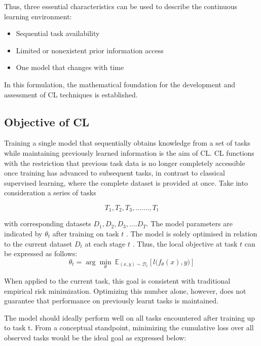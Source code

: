 \documentclass[english, LaM, oneside]{sapthesis}%
\numberwithin{equation}{chapter}
\begin{document}
Thus, three essential characteristics can be used to describe the continuous learning environment:

    \begin{itemize}
        \item Sequential task availability
        \item Limited or nonexistent prior information access
        \item One model that changes with time
    \end{itemize}

In this formulation, the mathematical foundation for the development and assessment of CL techniques is established.

\subsection{Objective of CL}
Training a single model that sequentially obtains knowledge from a set of tasks while maintaining previously learned information is the aim of CL. CL functions with the restriction that previous task data is no longer completely accessible once training has advanced to subsequent tasks, in contrast to classical supervised learning, where the complete dataset is provided at once.
Take into consideration a series of tasks

\begin{equation}
    T_1,T_2,T_3,\ldots\ldots.,T_t
\end{equation}

with corresponding datasets $D_1,D_2,D_3,\ldots.D_T$. The model parameters are indicated by $\theta_t$ after training on task $t$ . The model is solely optimised in relation to the current dataset $D_t$ at each stage $t$ . Thus, the local objective at task $t$ can be expressed as follows: 
\begin{equation}
    \theta_t = \arg\min_{\theta} \ \mathbb{E}_{(x,y)\sim \mathcal{D}_t} \left[ l\big(f_\theta(x), y\big) \right]
\end{equation}

When applied to the current task, this goal is consistent with traditional empirical risk minimization. Optimizing this number alone, however, does not guarantee that performance on previously learnt tasks is maintained.

The model should ideally perform well on all tasks encountered after training up to task t. From a conceptual standpoint, minimizing the cumulative loss over all observed tasks would be the ideal goal as expressed below:
\end{document}
